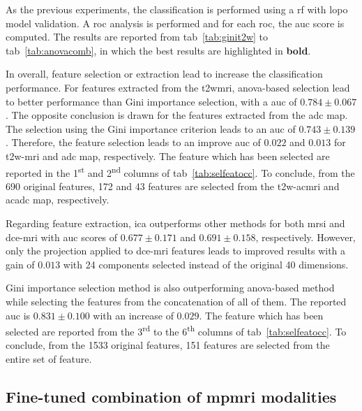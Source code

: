 As the previous experiments, the classification is performed using a \ac{rf} with \ac{lopo} model validation.
A \ac{roc} analysis is performed and for each \ac{roc}, the \ac{auc} score is computed.
The results are reported from \acs{tab}~\ref{tab:ginit2w} to \acs{tab}~\ref{tab:anovacomb}, in which the best results are highlighted in \textbf{bold}.

In overall, feature selection or extraction lead to increase the classification performance.
For features extracted from the \ac{t2w}\ac{mri}, \ac{anova}-based selection lead to better performance than Gini importance selection, with a \ac{auc} of $0.784 \pm 0.067$.
The opposite conclusion is drawn for the features extracted from the \ac{adc} map.
The selection using the Gini importance criterion leads to an \ac{auc} of $0.743 \pm 0.139$.
Therefore, the feature selection leads to an improve \ac{auc} of $0.022$ and $0.013$ for \ac{t2w}-\ac{mri} and \ac{adc} map, respectively.
The feature which has been selected are reported in the 1\textsuperscript{st} and 2\textsuperscript{nd} columns of \acs{tab}~\ref{tab:selfeatocc}.
To conclude, from the 690 original features, 172 and 43 features are selected from the \ac{t2w}-ac{mri} and ac{adc} map, respectively.

Regarding feature extraction, \ac{ica} outperforms other methods for both \ac{mrsi} and \ac{dce}-\ac{mri} with \ac{auc} scores of $0.677 \pm 0.171$ and $0.691 \pm 0.158$, respectively.
However, only the projection applied to \ac{dce}-\ac{mri} features leads to improved results with a gain of $0.013$ with 24 components selected instead of the original 40 dimensions.

Gini importance selection method is also outperforming \ac{anova}-based method while selecting the features from the concatenation of all of them.
The reported \ac{auc} is $0.831 \pm 0.100$ with an increase of $0.029$.
The feature which has been selected are reported from the 3\textsuperscript{rd} to the 6\textsuperscript{th} columns of \acs{tab}~\ref{tab:selfeatocc}.
To conclude, from the 1533 original features, 151 features are selected from the entire set of feature.

\subsection{Fine-tuned combination of \ac{mpmri} modalities}\label{subsec:chp6:exp-res:Ex4}

